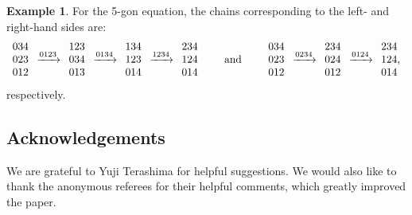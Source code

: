 \documentclass[10pt,a4paper]{amsart}
\numberwithin{equation}{section}
\theoremstyle{definition}
\newtheorem{Example}[Theorem]{Example}
\begin{document}
\begin{Example}
 For the 5-gon equation, the chains corresponding to the left- and right-hand sides are:
 \begin{equation*}
 \begin{array}{@{}c@{\;}c@{\;}c@{\;}c@{\;}c@{\;}c@{\;}c}
 \begin{array}{c}
 034\\
 023\\
 012
 \end{array}
 &
 \xrightarrow{0123}
 &
 \begin{array}{c}
 123\\
 034\\
 013
 \end{array}
 &
 \xrightarrow{0134}
 &
 \begin{array}{c}
 134\\
 123\\
 014
 \end{array}
 &
 \xrightarrow{1234}
 &
 \begin{array}{c@{}}
 234\\
 124\\
 014
 \end{array}
 \end{array}
 \qquad\text{and}\qquad
 \begin{array}{@{}c@{\;}c@{\;}c@{\;}c@{\;}c}
 \begin{array}{c}
 034\\
 023\\
 012
 \end{array}
 &
 \xrightarrow{0234}
 &
 \begin{array}{c}
 234\\
 024\\
 012
 \end{array}
 &
 \xrightarrow{0124}
 &
 \begin{array}{c@{}}
 234\\
 124\\
 014
 \end{array},
 \end{array}
 \end{equation*}
 respectively.
\end{Example}

\subsection*{Acknowledgements}

We are grateful to Yuji Terashima for helpful suggestions. We would also like to thank the anonymous referees for their helpful comments, which greatly improved the paper.
\end{document}
